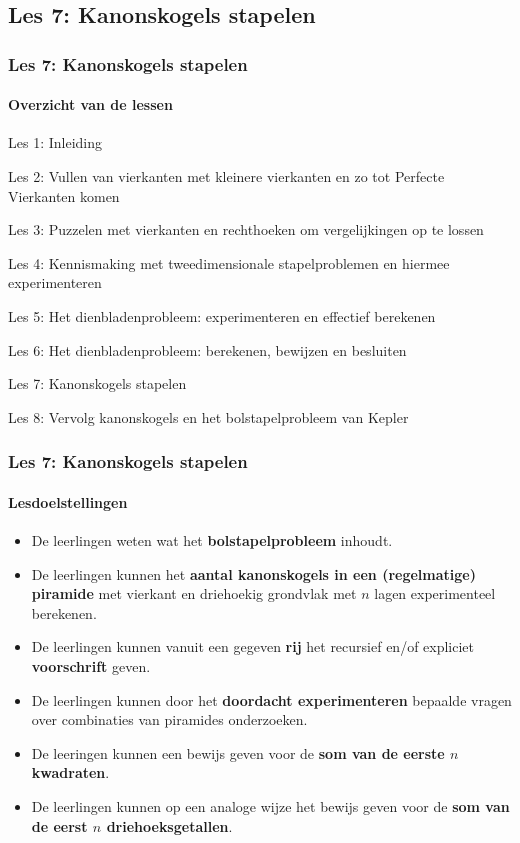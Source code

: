 \documentclass[dutch]{beamer}
\begin{document}


\subsection{Les 7: Kanonskogels stapelen}
\begin{frame}
\frametitle{Les 7: Kanonskogels stapelen}
\framesubtitle{Overzicht van de lessen}
\begin{list}{\quad}{}
\item Les 1: Inleiding
\item Les 2: Vullen van vierkanten met kleinere vierkanten en zo tot Perfecte Vierkanten komen
\item Les 3: Puzzelen met vierkanten en rechthoeken om vergelijkingen op te lossen
\item Les 4: Kennismaking met tweedimensionale stapelproblemen en hiermee experimenteren
\item Les 5: Het dienbladenprobleem: experimenteren en effectief berekenen
\item Les 6: Het dienbladenprobleem: berekenen, bewijzen en besluiten
\item {\color{blue}Les 7: Kanonskogels stapelen}
\item Les 8: Vervolg kanonskogels en het bolstapelprobleem van Kepler
\end{list}
\end{frame}

\begin{frame}
\frametitle{Les 7: Kanonskogels stapelen}
\framesubtitle{Lesdoelstellingen}
\begin{itemize}
\item De leerlingen weten wat het \textbf{bolstapelprobleem} inhoudt.
\item De leerlingen kunnen het \textbf{aantal kanonskogels in een (regelmatige) piramide} met vierkant en driehoekig grondvlak met $n$ lagen experimenteel berekenen.
\item De leerlingen kunnen vanuit een gegeven \textbf{rij} het recursief en/of expliciet \textbf{voorschrift} geven.
\item De leerlingen kunnen door het \textbf{doordacht experimenteren} bepaalde vragen over combinaties van piramides onderzoeken.
\item De leeringen kunnen een bewijs geven voor de \textbf{som van de eerste $n$ kwadraten}.
\item De leerlingen kunnen op een analoge wijze het bewijs geven voor de \textbf{som van de eerst $n$ driehoeksgetallen}.
\end{itemize}
\end{frame}
\end{document}
